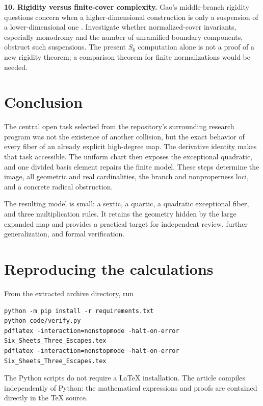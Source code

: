 \documentclass[11pt,a4paper]{article}
\theoremstyle{definition}
\begin{document}
\textbf{10. Rigidity versus finite-cover complexity.} Gao's middle-branch
rigidity questions concern when a higher-dimensional construction is
only a suspension of a lower-dimensional one \cite[\S4.5.2]{Gao}.
Investigate whether normalized-cover invariants, especially monodromy
and the number of unramified boundary components, obstruct such
suspensions. The present $S_6$ computation alone is not a proof of a
new rigidity theorem; a comparison theorem for finite normalizations
would be needed.

\section{Conclusion}
The central open task selected from the repository's surrounding research
program was not the existence of another collision, but the exact
behavior of every fiber of an already explicit high-degree map.
The derivative identity makes that task accessible. The uniform chart
then exposes the exceptional quadratic, and one divided basis element
repairs the finite model. These steps determine the image, all geometric
and real cardinalities, the branch and nonproperness loci, and a concrete
radical obstruction.

The resulting model is small: a sextic, a quartic, a quadratic exceptional
fiber, and three multiplication rules. It retains the geometry hidden by
the large expanded map and provides a practical target for independent
review, further generalization, and formal verification.

\appendix
{}
\section{Reproducing the calculations}
\label{app:reproduce}
From the extracted archive directory, run
\begin{lstlisting}
python -m pip install -r requirements.txt
python code/verify.py
pdflatex -interaction=nonstopmode -halt-on-error Six_Sheets_Three_Escapes.tex
pdflatex -interaction=nonstopmode -halt-on-error Six_Sheets_Three_Escapes.tex
\end{lstlisting}
The Python scripts do not require a LaTeX installation. The article
compiles independently of Python: the mathematical expressions and
proofs are contained directly in the TeX source.
\end{document}
